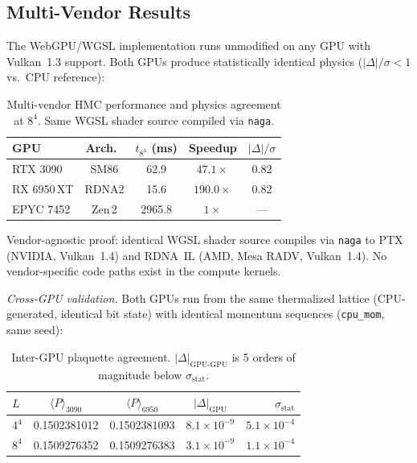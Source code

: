 \documentclass[aps,prl,twocolumn,superscriptaddress,showpacs]{revtex4-2}
\begin{document}
\subsection{Multi-Vendor Results}

The WebGPU/WGSL implementation runs unmodified on any GPU with
Vulkan~1.3 support. Both GPUs produce statistically identical physics
($|\Delta|/\sigma < 1$ vs.\ CPU reference):

\begin{table}[h]
\caption{Multi-vendor HMC performance and physics agreement at $8^4$.
  Same WGSL shader source compiled via \texttt{naga}.}
\label{tab:multivendor}
\begin{ruledtabular}
\begin{tabular}{lcccc}
GPU & Arch.\ & $t_{8^4}$ (ms) & Speedup & $|\Delta|/\sigma$ \\
\midrule
RTX 3090      & SM86  & 62.9 & $47.1\times$ & 0.82 \\
RX 6950\,XT   & RDNA2 & 15.6 & $190.0\times$ & 0.82 \\
EPYC 7452     & Zen\,2 & 2965.8 & $1\times$ & --- \\
\end{tabular}
\end{ruledtabular}
\end{table}

Vendor-agnostic proof: identical WGSL shader source compiles via
\texttt{naga} to PTX (NVIDIA, Vulkan~1.4) and RDNA~IL (AMD, Mesa RADV,
Vulkan~1.4). No vendor-specific code paths exist in the compute kernels.

\textit{Cross-GPU validation.} Both GPUs run from the same thermalized
lattice (CPU-generated, identical bit state) with identical momentum
sequences (\texttt{cpu\_mom}, same seed):

\begin{table}[h]
\caption{Inter-GPU plaquette agreement. $|\Delta|_\text{GPU-GPU}$ is 5
  orders of magnitude below $\sigma_\text{stat}$.}
\label{tab:crossgpu}
\begin{ruledtabular}
\begin{tabular}{lcccr}
$L$ & $\langle P\rangle_{3090}$ & $\langle P\rangle_{6950}$ &
  $|\Delta|_\text{GPU}$ & $\sigma_\text{stat}$ \\
\midrule
$4^4$ & 0.1502381012 & 0.1502381093 & $8.1{\times}10^{-9}$ & $5.1{\times}10^{-4}$ \\
$8^4$ & 0.1509276352 & 0.1509276383 & $3.1{\times}10^{-9}$ & $1.1{\times}10^{-4}$ \\
\end{tabular}
\end{ruledtabular}
\end{table}
\end{document}
